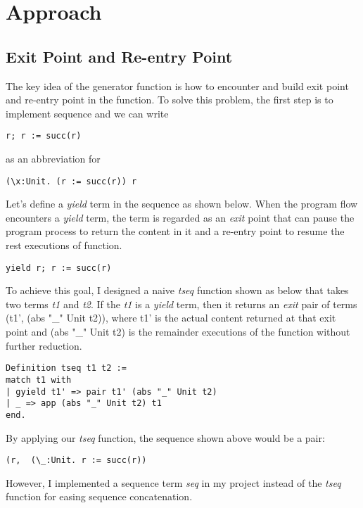 \section{Approach}

\subsection{Exit Point and Re-entry Point}
The key idea of the generator function is how to encounter and build exit point and re-entry point in the function. 
To solve this problem, the first step is to implement sequence and we can write 
\begin{lstlisting}[basicstyle=\small]
r; r := succ(r)
\end{lstlisting}
as an abbreviation for 
\begin{lstlisting}[basicstyle=\small]
(\x:Unit. (r := succ(r)) r
\end{lstlisting}
Let's define a \textit{yield} term in the sequence as shown below. When the program flow encounters a \textit{yield} term, the term is regarded as an \textit{exit} point that can pause the program process to return the content in it and a re-entry point to resume the rest executions of function.
\begin{lstlisting}[basicstyle=\small]
yield r; r := succ(r)
\end{lstlisting}
To achieve this goal, I designed a naive \textit{tseq} function shown as below that takes two terms \textit{t1} and \textit{t2}. If the \textit{t1} is a \textit{yield} term, then it returns an \textit{exit} pair of terms (t1', (abs "_" Unit t2)), where t1' is the actual content returned at that exit point and (abs "_" Unit t2) is the remainder executions of the function without further reduction.
\begin{lstlisting}[basicstyle=\small]
Definition tseq t1 t2 := 
match t1 with 
| gyield t1' => pair t1' (abs "_" Unit t2)
| _ => app (abs "_" Unit t2) t1
end.
\end{lstlisting}
By applying our \textit{tseq} function, the sequence shown above would be a pair:
\begin{lstlisting}[basicstyle=\small]
(r,  (\_:Unit. r := succ(r))
\end{lstlisting}
However, I implemented a sequence term \textit{seq} in my project instead of the \textit{tseq} function for easing sequence concatenation.

